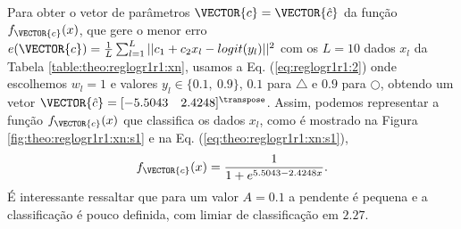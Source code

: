 \begin{SolutionT}\label{sol:theo:reglogr1r1:s1}
Para obter o vetor de parâmetros $\VECTOR{c}=\VECTOR{\hat{c}}$ da função $f_{\VECTOR{c}}(x)$, 
que gere o menor erro $e(\VECTOR{c}) =  \frac{1}{L}\sum_{l=1}^{L} ||c_1 +c_2 x_l-logit(y_l)||^2$
com os $L=10$ dados $x_l$ da Tabela \ref{table:theo:reglogr1r1:xn},
usamos a Eq. (\ref{eq:reglogr1r1:2}) onde escolhemos $w_l=1$ e valores $y_l \in \{0.1,~ 0.9\}$,
$0.1$ para $\bigtriangleup$ e $0.9$ para $\bigcirc$,
obtendo um vetor $\VECTOR{\hat{c}}=[-5.5043\quad 2.4248 ]^{\transpose}$.
Assim, podemos representar a função $f_{\VECTOR{c}}(x)$ que classifica os dados $x_l$, 
como é mostrado na Figura \ref{fig:theo:reglogr1r1:xn:s1} e na Eq. (\ref{eq:theo:reglogr1r1:xn:s1}),
\begin{equation}\label{eq:theo:reglogr1r1:xn:s1}
f_{\VECTOR{c}}(x)= \frac{1}{1+e^{ 5.5043-2.4248 x}}.
\end{equation}
É interessante ressaltar que para um valor $A=0.1$ a pendente é pequena e a classificação é pouco definida,
com limiar de classificação em $2.27$.
\end{SolutionT}


